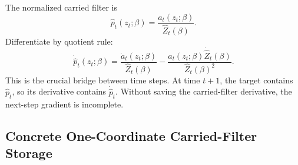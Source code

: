 \documentclass[11pt]{article}
\begin{document}
The normalized carried filter is
\[
    \widehat p_t(z_t;\beta)
    =
    \frac{a_t(z_t;\beta)}{\widehat Z_t(\beta)}.
    \label{eq:p24-p19-75}
\]
Differentiate by quotient rule:
\[
    \dot{\widehat p}_t(z_t;\beta)
    =
    \frac{\dot a_t(z_t;\beta)}{\widehat Z_t(\beta)}
    -
    \frac{a_t(z_t;\beta)\dot{\widehat Z}_t(\beta)}
    {\widehat Z_t(\beta)^2}.
    \label{eq:p24-p19-76}
\]
This is the crucial bridge between time steps.  At time \(t+1\), the target
contains \(\widehat p_t\), so its derivative contains
\(\dot{\widehat p}_t\).  Without saving the carried-filter derivative, the
next-step gradient is incomplete.

\subsection{Concrete One-Coordinate Carried-Filter Storage}
\end{document}
